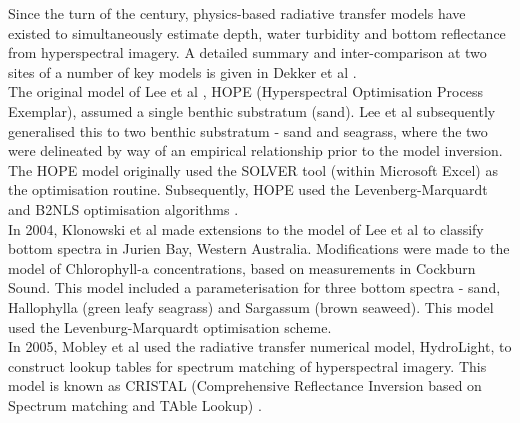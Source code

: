 \documentclass[12pt]{article}
\numberwithin{equation}{section}
\begin{document}

Since the turn of the century, physics-based radiative transfer models have existed to 
simultaneously estimate depth, water turbidity and bottom reflectance from hyperspectral 
imagery. A detailed summary and inter-comparison at two sites of a number of key models 
is given in Dekker et al \cite{dekker2011}. \\

The original model of Lee et al \cite{lee1998}\cite{lee1999}, HOPE (Hyperspectral Optimisation 
Process Exemplar), assumed a single benthic substratum (sand). Lee et al \cite{lee2001} 
subsequently generalised this to two benthic substratum - sand and seagrass, where the two 
were delineated by way of an empirical relationship prior to the model inversion. The HOPE 
model originally used the SOLVER tool (within Microsoft Excel) as the optimisation routine. 
Subsequently, HOPE used the Levenberg-Marquardt and B2NLS optimisation 
algorithms \cite{lee2009}.  \\

In 2004, Klonowski et al \cite{klonowski2004}\cite{klonowski2007} made extensions to the model of Lee et al 
to classify bottom spectra in Jurien Bay, Western Australia. Modifications were made to the model of 
Chlorophyll-a concentrations, based on measurements in Cockburn Sound. This model included a 
parameterisation for three bottom spectra - sand, Hallophylla (green leafy seagrass) and Sargassum 
(brown seaweed). This model used the Levenburg-Marquardt optimisation scheme. \\ 

In 2005, Mobley et al \cite{mobley2005} used the radiative transfer numerical model, HydroLight, 
to construct lookup tables for spectrum matching of hyperspectral imagery. This model is 
known as CRISTAL (Comprehensive Reflectance Inversion based on Spectrum matching and TAble 
Lookup) \cite{dekker2011}. \\
\end{document}
